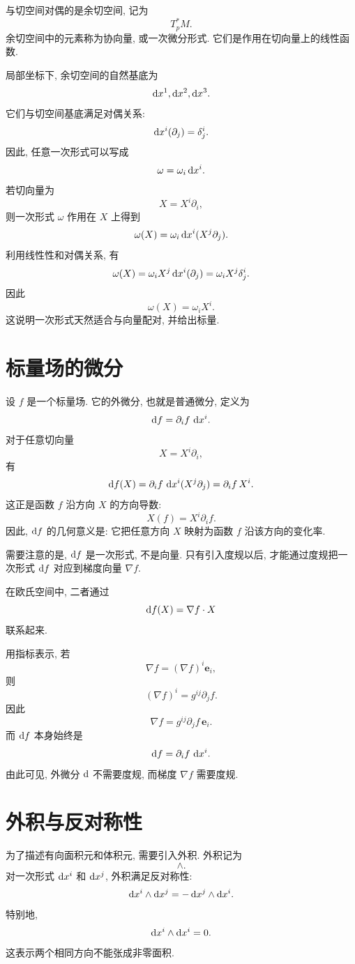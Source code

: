 与切空间对偶的是余切空间, 记为
\[
T_p^*M.
\]
余切空间中的元素称为协向量, 或一次微分形式. 它们是作用在切向量上的线性函数. 

局部坐标下, 余切空间的自然基底为
\[
\mathop{}\!\mathrm{d} x^1,\mathop{}\!\mathrm{d} x^2,\mathop{}\!\mathrm{d} x^3.
\]
它们与切空间基底满足对偶关系: 
\begin{equation}\label{eq:3.2}
	\mathop{}\!\mathrm{d} x^i(\partial_j)=\delta^i_j.
\end{equation}
因此, 任意一次形式可以写成
\[
\omega=\omega_i \mathop{}\!\mathrm{d} x^i.
\]
若切向量为
\[
X=X^i\partial_i,
\]
则一次形式 $\omega$ 作用在 $X$ 上得到
\[
\omega(X)
=
\omega_i \mathop{}\!\mathrm{d} x^i(X^j\partial_j).
\]
利用线性性和对偶关系, 有
\[
\omega(X)
=
\omega_iX^j\mathop{}\!\mathrm{d} x^i(\partial_j)
=
\omega_iX^j\delta^i_j.
\]
因此
\[
\omega(X)=\omega_iX^i.
\]
这说明一次形式天然适合与向量配对, 并给出标量. 

\section{标量场的微分}

设 $f$ 是一个标量场. 它的外微分, 也就是普通微分, 定义为
\[
\mathop{}\!\mathrm{d} f=\partial_i f\,\mathop{}\!\mathrm{d} x^i.
\]
对于任意切向量
\[
X=X^i\partial_i,
\]
有
\[
\mathop{}\!\mathrm{d} f(X)
=
\partial_i f\,\mathop{}\!\mathrm{d} x^i(X^j\partial_j)
=
\partial_i f\,X^i.
\]
这正是函数 $f$ 沿方向 $X$ 的方向导数: 
\[
X(f)=X^i\partial_i f.
\]
因此, $\mathop{}\!\mathrm{d} f$ 的几何意义是: 它把任意方向 $X$ 映射为函数 $f$ 沿该方向的变化率. 

需要注意的是, $\mathop{}\!\mathrm{d} f$ 是一次形式, 不是向量. 只有引入度规以后, 才能通过度规把一次形式 $\mathop{}\!\mathrm{d} f$ 对应到梯度向量 $\nabla f$. 

在欧氏空间中, 二者通过
\[
\mathop{}\!\mathrm{d} f(X)=\nabla f\cdot X
\]
联系起来. 

用指标表示, 若
\[
\nabla f=(\nabla f)^i\bm{e}_i,
\]
则
\[
(\nabla f)^i=g^{ij}\partial_j f.
\]
因此
\[
\nabla f
=
g^{ij}\partial_j f\,\bm{e}_i.
\]
而 $\mathop{}\!\mathrm{d} f$ 本身始终是
\[
\mathop{}\!\mathrm{d} f=\partial_i f\,\mathop{}\!\mathrm{d} x^i.
\]
由此可见, 外微分 $\mathop{}\!\mathrm{d}$ 不需要度规, 而梯度 $\nabla f$ 需要度规. 

\section{外积与反对称性}

为了描述有向面积元和体积元, 需要引入外积. 外积记为
\[
\wedge.
\]
对一次形式 $\mathop{}\!\mathrm{d} x^i$ 和 $\mathop{}\!\mathrm{d} x^j$, 外积满足反对称性: 
\begin{equation}\label{eq:3.3}
	\mathop{}\!\mathrm{d} x^i\wedge \mathop{}\!\mathrm{d} x^j=-\mathop{}\!\mathrm{d} x^j\wedge \mathop{}\!\mathrm{d} x^i.
\end{equation}
特别地, 
\[
\mathop{}\!\mathrm{d} x^i\wedge \mathop{}\!\mathrm{d} x^i=0.
\]
这表示两个相同方向不能张成非零面积. 

